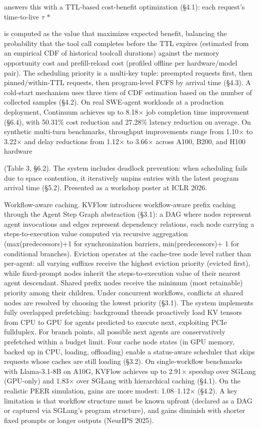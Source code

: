 \documentclass[preprint,12pt]{elsarticle}
\begin{document}
answers this with a TTL-based cost-benefit optimization (\S{}4.1): each request's time-to-live $\tau$ $\ast$


is computed as the value that maximizes expected benefit, balancing the probability that the tool call completes before the TTL expires (estimated from an empirical CDF of historical toolcall durations) against the memory opportunity cost and prefill-reload cost (profiled offline per hardware/model pair). The scheduling priority is a multi-key tuple: preempted requests first, then pinned/within-TTL requests, then program-level FCFS by arrival time (\S{}4.3). A cold-start mechanism uses three tiers of CDF estimation based on the number of collected samples (\S{}4.2). On real SWE-agent workloads at a production deployment, Continuum achieves up to 8.18$\times$ job completion time improvement (\S{}6.4), with 50.31\% cost reduction and 27.28\% latency reduction on average. On synthetic multi-turn benchmarks, throughput improvements range from 1.10$\times$ to 3.22$\times$ and delay reductions from 1.12$\times$ to 3.66$\times$ across A100, B200, and H100 hardware


(Table 3, \S{}6.2). The system includes deadlock prevention: when scheduling fails due to space contention, it iteratively unpins entries with the latest program arrival time (\S{}5.2). Presented as a workshop poster at ICLR 2026.


Workflow-aware caching. KVFlow \cite{v5ref27} introduces workflow-aware prefix caching through the Agent Step Graph abstraction (\S{}3.1): a DAG where nodes represent agent invocations and edges represent dependency relations, each node carrying a steps-to-execution value computed via recursive aggregation (max(predecessors)+1 for synchronization barriers, min(predecessors)+ 1 for conditional branches). Eviction operates at the cache-tree node level rather than per-agent: all varying suffixes receive the highest eviction priority (evicted first), while fixed-prompt nodes inherit the steps-to-execution value of their nearest agent descendant. Shared prefix nodes receive the minimum (most retainable) priority among their children. Under concurrent workflows, conflicts at shared nodes are resolved by choosing the lowest priority (\S{}3.1). The system implements fully overlapped prefetching: background threads proactively load KV tensors from CPU to GPU for agents predicted to execute next, exploiting PCIe fullduplex. For branch points, all possible next agents are conservatively prefetched within a budget limit. Four cache node states (in GPU memory, backed up in CPU, loading, offloading) enable a status-aware scheduler that skips requests whose caches are still loading (\S{}3.2). On single-workflow benchmarks with Llama-3.1-8B on A10G, KVFlow achieves up to 2.91$\times$ speedup over SGLang (GPU-only) and 1.83$\times$ over SGLang with hierarchical caching (\S{}4.1). On the realistic PEER simulation, gains are more modest: 1.08--1.12$\times$ (\S{}4.2). A key limitation is that workflow structure must be known upfront (declared as a DAG or captured via SGLang's program structure), and gains diminish with shorter fixed prompts or longer outputs (NeurIPS 2025).
\end{document}
